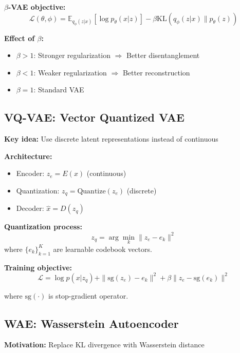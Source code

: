 \textbf{$\beta$-VAE objective:}
\begin{equation}
    \mathcal{L}(\theta, \phi) = \mathbb{E}_{q_\phi(z|x)}[\log p_\theta(x|z)] - \beta \text{KL}(q_\phi(z|x) \| p_\theta(z))
\end{equation}

\textbf{Effect of $\beta$:}
\begin{itemize}
    \item $\beta > 1$: Stronger regularization $\Rightarrow$ Better disentanglement
    \item $\beta < 1$: Weaker regularization $\Rightarrow$ Better reconstruction
    \item $\beta = 1$: Standard VAE
\end{itemize}

\subsection{VQ-VAE: Vector Quantized VAE}

\textbf{Key idea:} Use discrete latent representations instead of continuous

\textbf{Architecture:}
\begin{itemize}
    \item Encoder: $z_e = E(x)$ (continuous)
    \item Quantization: $z_q = \text{Quantize}(z_e)$ (discrete)
    \item Decoder: $\hat{x} = D(z_q)$
\end{itemize}

\textbf{Quantization process:}
\begin{equation}
    z_q = \arg\min_{k} \|z_e - e_k\|^2
\end{equation}
where $\{e_k\}_{k=1}^K$ are learnable codebook vectors.

\textbf{Training objective:}
\begin{equation}
    \mathcal{L} = \log p(x|z_q) + \|\text{sg}(z_e) - e_k\|^2 + \beta\|z_e - \text{sg}(e_k)\|^2
\end{equation}

where $\text{sg}(\cdot)$ is stop-gradient operator.

\subsection{WAE: Wasserstein Autoencoder}

\textbf{Motivation:} Replace KL divergence with Wasserstein distance

